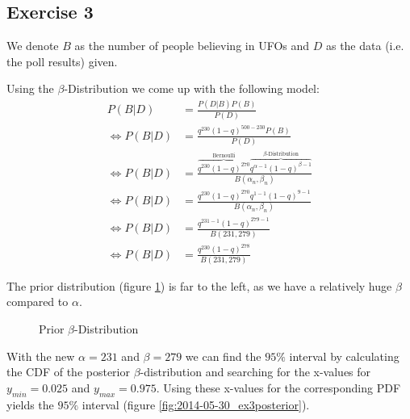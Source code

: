 \subsection*{Exercise 3}
We denote $B$ as the number of people believing in UFOs and $D$ as the data (i.e. the poll results) given.

Using the $\beta$-Distribution we come up with the following model:
\begin{align*}
                P(B|D) &= \frac{P(D|B)P(B)}{P(D)} \\
\Leftrightarrow P(B|D) &= \frac{q^{230}\left(1-q\right)^{500-230}P(B)}{P(D)}\\
\Leftrightarrow P(B|D) &= \frac{\overbrace{q^{230}\left(1-q\right)^{270}}^\text{Bernoulli} \overbrace{q^{\alpha-1}\left(1-q\right)^{\beta-1}}^\text{$\beta$-Distribution}}{B(\alpha_n,\beta_n)} \\
\Leftrightarrow P(B|D) &= \frac{q^{230}\left(1-q\right)^{270} q^{1-1}\left(1-q\right)^{9-1}}{B(\alpha_n,\beta_n)} \\
\Leftrightarrow P(B|D) &= \frac{q^{231-1}\left(1-q\right)^{279-1}}{B(231,279)} \\
\Leftrightarrow P(B|D) &= \frac{q^{230}\left(1-q\right)^{278}}{B(231,279)}
\end{align*}

The prior distribution (figure \ref{fig:2014-05-30_ex3prior}) is far to the left, as we have a relatively huge $\beta$ compared to $\alpha$.

\begin{figure}[!ht]
\centering
{}
\caption{Prior $\beta$-Distribution}
\label{fig:2014-05-30_ex3prior}
\end{figure}

With the new $\alpha = 231$ and $\beta = 279$ we can find the $95\%$ interval by calculating the CDF of the posterior $\beta$-distribution and searching for the x-values for $y_{min}=0.025$ and $y_{max}=0.975$. Using these x-values for the corresponding PDF yields the $95\%$ interval (figure \ref{fig:2014-05-30_ex3posterior}).

